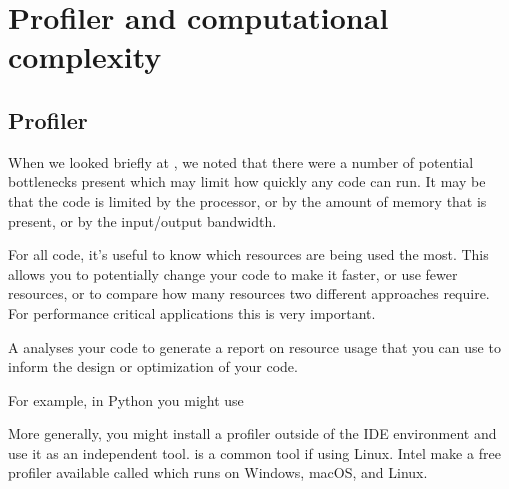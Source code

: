 \documentclass[letterpaper,10pt,british]{sphinxmanual}
\begin{document}
\sphinxstepscope


\section{Profiler and computational complexity}
\label{\detokenize{chapters/software_development_tools/profiler:profiler-and-computational-complexity}}\label{\detokenize{chapters/software_development_tools/profiler::doc}}

\subsection{Profiler}
\label{\detokenize{chapters/software_development_tools/profiler:profiler}}
\sphinxAtStartPar
When we looked briefly at {\hyperref[\detokenize{chapters/computer_hardware:computer-hardware}]{}}, we noted that there were a number of potential bottlenecks present which may limit how quickly any code can run. It may be that the code is limited by the processor, or by the amount of memory that is present, or by the input/output bandwidth.

\sphinxAtStartPar
For all code, it’s useful to know which resources are being used the most. This allows you to potentially change your code to make it faster, or use fewer resources, or to compare how many resources two different approaches require. For performance critical applications this is very important.

\sphinxAtStartPar
A  analyses your code to generate a report on resource usage that you can use to inform the design or optimization of your code.

\sphinxAtStartPar
For example, in Python you might use

\begin{sphinxVerbatim}[commandchars=\\\{\}]
\end{sphinxVerbatim}

\sphinxAtStartPar
More generally, you might install a profiler outside of the IDE environment and use it as an independent tool.  is a common tool if using Linux. Intel make a free profiler available called   which runs on Windows, macOS, and Linux.
\end{document}
